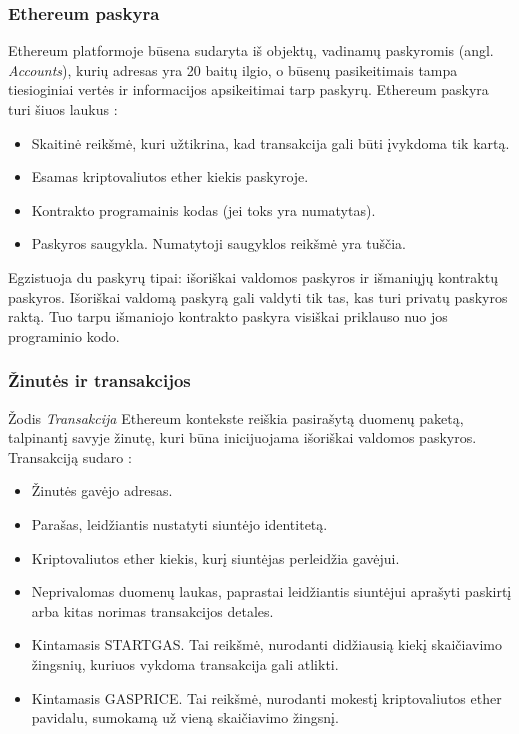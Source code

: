\documentclass{VUMIFPSkursinis}
\begin{document}
\subsubsection{Ethereum paskyra}
Ethereum platformoje būsena sudaryta iš objektų, vadinamų paskyromis (angl. \textit{Accounts}), kurių adresas yra 20 baitų ilgio, o būsenų pasikeitimais tampa tiesioginiai vertės ir informacijos apsikeitimai tarp paskyrų. Ethereum paskyra turi šiuos laukus \cite{buterin2014next}:
\begin{itemize}
    \item Skaitinė reikšmė, kuri užtikrina, kad transakcija gali būti įvykdoma tik kartą. 
    \item Esamas kriptovaliutos ether kiekis paskyroje. 
    \item Kontrakto programainis kodas (jei toks yra numatytas).
    \item Paskyros saugykla. Numatytoji saugyklos reikšmė yra tuščia.
\end{itemize}

Egzistuoja du paskyrų tipai: išoriškai valdomos paskyros ir išmaniųjų kontraktų paskyros. Išoriškai valdomą paskyrą gali valdyti tik tas, kas turi privatų paskyros raktą. Tuo tarpu išmaniojo kontrakto paskyra visiškai priklauso nuo jos programinio kodo.

\subsubsection{Žinutės ir transakcijos}
Žodis \textit{Transakcija} Ethereum kontekste reiškia pasirašytą duomenų paketą, talpinantį savyje žinutę, kuri būna inicijuojama išoriškai valdomos paskyros. Transakciją sudaro \cite{buterin2014next}:
\begin{itemize}
    \item Žinutės gavėjo adresas.
    \item Parašas, leidžiantis nustatyti siuntėjo identitetą.
    \item Kriptovaliutos ether kiekis, kurį siuntėjas perleidžia gavėjui.
    \item Neprivalomas duomenų laukas, paprastai leidžiantis siuntėjui aprašyti paskirtį arba kitas norimas transakcijos detales.
    \item Kintamasis STARTGAS. Tai reikšmė, nurodanti didžiausią kiekį skaičiavimo žingsnių, kuriuos vykdoma transakcija gali atlikti.
    \item Kintamasis GASPRICE. Tai reikšmė, nurodanti mokestį kriptovaliutos ether pavidalu, sumokamą už vieną skaičiavimo žingsnį.
\end{itemize}
\end{document}
